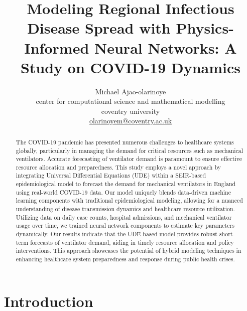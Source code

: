 \documentclass[12pt]{article}
\title{Modeling Regional Infectious Disease Spread with Physics-Informed Neural Networks: A Study on COVID-19 Dynamics}
\author{Michael Ajao-olarinoye \\
    center for computational science and mathematical modelling \\
    coventry university \\
    \url{olarinoyem@coventry.ac.uk}}
\date{}
\begin{document}
\maketitle

\begin{abstract}
    The COVID-19 pandemic has presented numerous challenges to healthcare systems globally, particularly in managing the demand for critical resources such as mechanical ventilators. Accurate forecasting of ventilator demand is paramount to ensure effective resource allocation and preparedness. This study employs a novel approach by integrating Universal Differential Equations (UDE) within a SEIR-based epidemiological model to forecast the demand for mechanical ventilators in England using real-world COVID-19 data. Our model uniquely blends data-driven machine learning components with traditional epidemiological modeling, allowing for a nuanced understanding of disease transmission dynamics and healthcare resource utilization. Utilizing data on daily case counts, hospital admissions, and mechanical ventilator usage over time, we trained neural network components to estimate key parameters dynamically. Our results indicate that the UDE-based model provides robust short-term forecasts of ventilator demand, aiding in timely resource allocation and policy interventions. This approach showcases the potential of hybrid modeling techniques in enhancing healthcare system preparedness and response during public health crises.
\end{abstract}

\section{Introduction}
\end{document}
